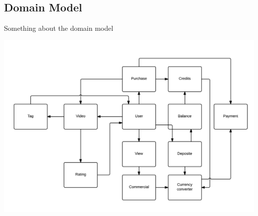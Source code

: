 \subsection{Domain Model}
Something about the domain model
\begin{center}
\includegraphics[scale=0.15]{DomainModel.png}
\end{center}

